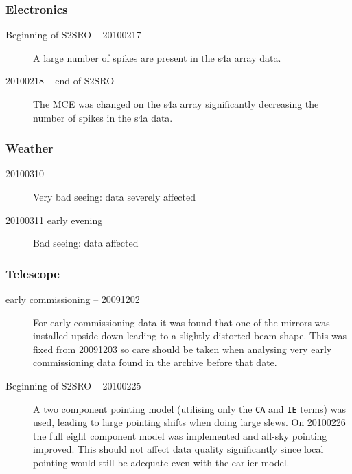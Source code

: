 \documentclass[twoside,11pt]{starlink}
\begin{document}
\subsubsection{Electronics}

\begin{description}

\item[Beginning of S2SRO -- 20100217] \mbox{}

  A large number of spikes are present in the s4a array data.

\item[20100218 -- end of S2SRO] \mbox{}

  The MCE was changed on the s4a array significantly decreasing the
  number of spikes in the s4a data.

\end{description}

\subsubsection{Weather}

\begin{description}

\item[20100310] \mbox{}

  Very bad seeing: data severely affected

\item[20100311 early evening] \mbox{}
  Bad seeing: data affected

\end{description}

\subsubsection{Telescope}

\begin{description}

\item[early commissioning -- 20091202] \mbox{}

  For early commissioning data it was found that one of the mirrors
  was installed upside down leading to a slightly distorted beam
  shape. This was fixed from 20091203 so care should be taken when
  analysing very early commissioning data found in the archive before
  that date.

\item[Beginning of S2SRO -- 20100225] \mbox{}

  A two component pointing model (utilising only the \texttt{CA} and
  \texttt{IE} terms) was used, leading to large pointing shifts when
  doing large slews. On 20100226 the full eight component model was
  implemented and all-sky pointing improved. This should not affect
  data quality significantly since local pointing would still be
  adequate even with the earlier model.

\end{description}
\end{document}
